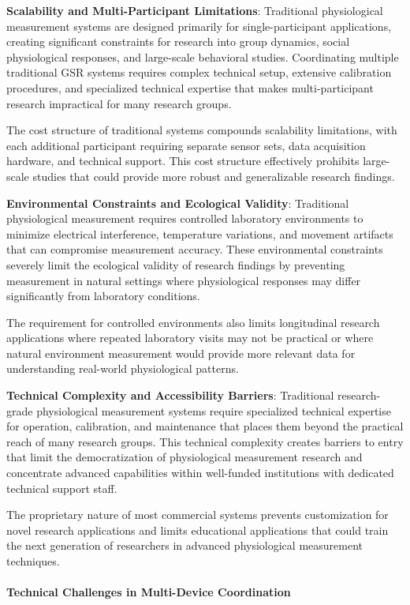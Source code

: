\documentclass[11pt,a4paper]{report}
\begin{document}
\textbf{Scalability and Multi-Participant Limitations}: Traditional physiological measurement systems are designed primarily
for single-participant applications, creating significant constraints for research into group dynamics, social
physiological responses, and large-scale behavioral studies. Coordinating multiple traditional GSR systems requires
complex technical setup, extensive calibration procedures, and specialized technical expertise that makes
multi-participant research impractical for many research groups.

The cost structure of traditional systems compounds scalability limitations, with each additional participant requiring
separate sensor sets, data acquisition hardware, and technical support. This cost structure effectively prohibits
large-scale studies that could provide more robust and generalizable research findings.

\textbf{Environmental Constraints and Ecological Validity}: Traditional physiological measurement requires controlled
laboratory environments to minimize electrical interference, temperature variations, and movement artifacts that can
compromise measurement accuracy. These environmental constraints severely limit the ecological validity of research
findings by preventing measurement in natural settings where physiological responses may differ significantly from
laboratory conditions.

The requirement for controlled environments also limits longitudinal research applications where repeated laboratory
visits may not be practical or where natural environment measurement would provide more relevant data for understanding
real-world physiological patterns.

\textbf{Technical Complexity and Accessibility Barriers}: Traditional research-grade physiological measurement systems
require specialized technical expertise for operation, calibration, and maintenance that places them beyond the
practical reach of many research groups. This technical complexity creates barriers to entry that limit the
democratization of physiological measurement research and concentrate advanced capabilities within well-funded
institutions with dedicated technical support staff.

The proprietary nature of most commercial systems prevents customization for novel research applications and limits
educational applications that could train the next generation of researchers in advanced physiological measurement
techniques.

\paragraph{Technical Challenges in Multi-Device Coordination}
\end{document}
